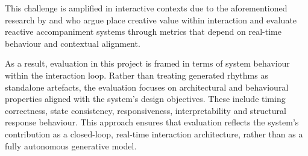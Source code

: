 This challenge is amplified in interactive contexts due to the
aforementioned research by \citet{smith2022humanai} and \citet{ostermann2021evaluating} who argue
place creative value within interaction and evaluate reactive
accompaniment systems through metrics that depend on real-time behaviour
and contextual alignment.

As a result, evaluation in this project is framed in terms of system
behaviour within the interaction loop. Rather than treating generated
rhythms as standalone artefacts, the evaluation focuses on architectural
and behavioural properties aligned with the system's design objectives.
These include timing correctness, state consistency, responsiveness,
interpretability and structural response behaviour. This approach
ensures that evaluation reflects the system's contribution as a
closed-loop, real-time interaction architecture, rather than as a fully
autonomous generative model.
